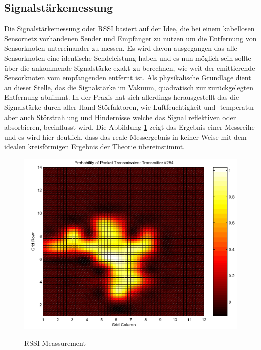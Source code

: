 \subsection{Signalstärkemessung}
Die Signalstärkemessung oder \ac{RSSI} basiert auf der Idee, die bei einem kabellosen Sensornetz vorhandenen Sender und Empfänger zu nutzen um die 
Entfernung von Sensorknoten untereinander zu messen. Es wird davon ausgegangen das alle Sensorknoten eine identische Sendeleistung haben und es nun
möglich sein sollte über die ankommende Signalstärke exakt zu berechnen, wie weit der emittierende Sensorknoten vom empfangenden entfernt ist. Als 
physikalische Grundlage dient an dieser Stelle, das die Signalstärke im Vakuum, quadratisch zur zurückgelegten Entfernung abnimmt. In der Praxis 
hat sich allerdings herausgestellt das die Signalstärke durch aller Hand Störfaktoren, wie Luftfeuchtigkeit und -temperatur aber auch Störstrahlung 
und Hindernisse welche das Signal reflektiven oder absorbieren, beeinflusst wird. Die Abbildung \ref{fig:RSSI} zeigt das Ergebnis einer Messreihe und es 
wird hier deutlich, dass das reale Messergebnis in keiner Weise mit dem idealen kreisförmigen Ergebnis der Theorie übereinstimmt. 

\begin{figure}
  \caption{RSSI Meassurement}
  \includegraphics[scale=0.75]{img/RSSI1}\\
  \cite{whitehouse}
  \label{fig:RSSI}
\end{figure}

